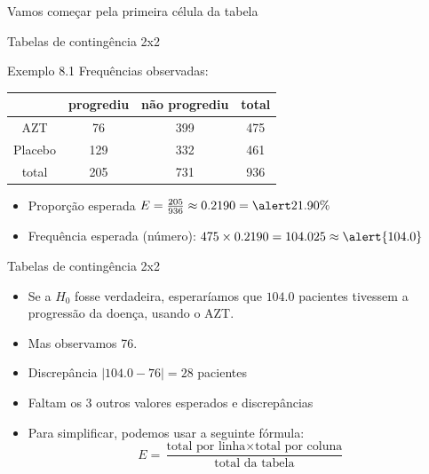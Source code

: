 \documentclass{beamer}
\begin{document}
\begin{frame}
  \begin{center}
    Vamos começar pela primeira célula da tabela
  \end{center}
\end{frame}

\begin{frame}{\scriptsize Tabelas de contingência 2x2}
  \begin{exampleblock}{Exemplo 8.1}
    \footnotesize
    Frequências observadas:
    \begin{tabular}{c|c|c|c}
      & progrediu & não progrediu & total\\
      \hline
      AZT & 76 & 399 & 475\\
      \hline
      Placebo & 129 & 332 & 461\\
      \hline
      total & \alert{205} & 731 & \alert{936}\\
    \end{tabular}
  \end{exampleblock}
  \vfill
  \begin{itemize}
    \footnotesize
  \item Proporção esperada $E = \frac{205}{936} \approx 0.2190 = \alert{21.90\%}$
  \item Frequência esperada (número): $475 \times 0.2190 = 104.025 \approx \alert{104.0}$
  \end{itemize}
\end{frame}

\begin{frame}{\scriptsize Tabelas de contingência 2x2}
  \begin{itemize}
    \footnotesize
  \item Se a $H_0$ fosse verdadeira, esperaríamos que $104.0$
    pacientes tivessem a progressão da doença, usando o AZT.
    \bigskip
  \item Mas observamos 76.
  \item Discrepância $|104.0 - 76| = 28$ pacientes
    \bigskip
    \bigskip
    \footnotesize
  \item Faltam os 3 outros valores esperados e discrepâncias
    \bigskip
    \bigskip
  \item Para simplificar, podemos usar a seguinte fórmula:
  \begin{displaymath}
    E = \frac{ \text{total por linha} \times \text{total por coluna}
    }{ \text{total da tabela} }
  \end{displaymath}
  \end{itemize}
\end{frame}
\end{document}
